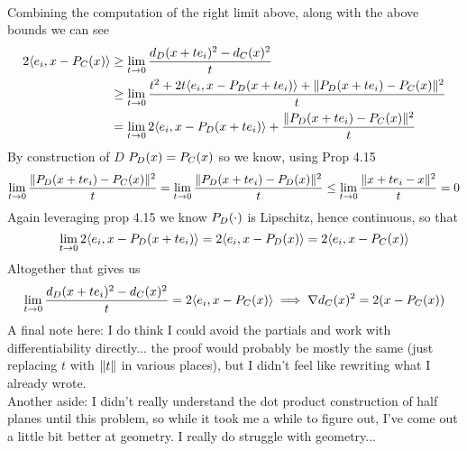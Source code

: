 \documentclass{article}
\newenvironment{ex}[1]
  {\renewcommand\theexercise{#1}\exercise}
  {\endexercise}
\begin{document}
\begin{ex}{7.7}
\begin{align*}
  \end{align*}
  Combining the computation of the right limit above, along with the above bounds we can see
  \begin{align*}
    2 \langle e_i, x - P_{C}(x)\rangle &\ge \lim_{t \to 0} \frac{d_{D}(x + t e_i)^2 - d_{C}(x)^2}{t} \\
    & \ge \lim_{t \to 0} \frac{t^2 + 2t \langle e_i, x-P_{D}(x+te_i)\rangle + \lVert P_{D}(x+te_i)-P_{C}(x)\rVert^2}{t} \\
    & = \lim_{t \to 0} 2\langle e_i, x-P_{D}(x+te_i)\rangle + \frac{\lVert P_{D}(x+te_i)-P_{C}(x)\rVert^2}{t}
  \end{align*}
  By construction of $D$ $P_{D}(x) = P_{C}(x)$ so we know, using Prop 4.15
  $$
  \lim_{t \to 0} \frac{\lVert P_{D}(x+te_i)-P_{C}(x)\rVert^2}{t} = \lim_{t \to 0} \frac{\lVert P_{D}(x+te_i)-P_{D}(x)\rVert^2}{t} \le \lim_{t \to 0} \frac{\lVert x + te_i - x\rVert^2}{t} = 0
  $$
  Again leveraging prop 4.15 we know $P_{D}(\cdot)$ is Lipschitz, hence continuous, so that
  $$
  \lim_{t \to 0} 2\langle e_i, x-P_{D}(x+te_i)\rangle = 2\langle e_i, x-P_{D}(x)\rangle = 2\langle e_i, x-P_{C}(x)\rangle
  $$
  Altogether that gives us
  $$
  \lim_{t \to 0} \frac{d_{D}(x + t e_i)^2 - d_{C}(x)^2}{t} = 2\langle e_i, x-P_{C}(x)\rangle \implies \nabla d_{C}(x)^2 = 2(x - P_{C}(x))
  $$
  A final note here: I do think I could avoid the partials and work with differentiability directly... the proof would probably be mostly the same (just replacing $t$ with $\lVert t\rVert$ in various places), but I didn't feel like rewriting what I already wrote. \, \\
  Another aside: I didn't really understand the dot product construction of half planes until this problem, so while it took me a while to figure out, I've come out a little bit better at geometry. I really do struggle with geometry...
\end{ex} %
\end{document}
